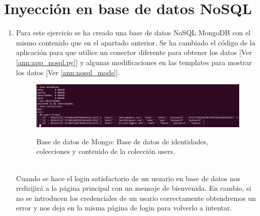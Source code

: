 \documentclass[a4paper,oneside]{article}
\begin{document}
\section{Inyección en base de datos NoSQL}
\begin{enumerate}[label=\textbf{\alph*)}]
\item Para este ejercicio se ha creado una base de datos NoSQL MongoDB \cite{mongo} con el mismo contenido que en el apartado anterior. Se ha cambiado el código de la aplicación para que utilice un conector diferente para obtener los datos [Ver \ref{ann:app_nosql.py}] y algunas modificaciones en las templates para mostrar los datos [Ver \ref{ann:nosql_mods}].
\begin{figure}[h!]
  \centering
  \includegraphics[scale=0.34]{images/mongo.png}\\
  \caption{Base de datos de Mongo: Base de datos de identidades, colecciones y contenido de la colección users.}
  \label{fig:mongo}
\end{figure}\\

Cuando se hace el login satisfactorio de un usuario en base de datos nos redirijirá a la página principal con un mensaje de bienvenida. En cambio, si no se introducen los credenciales de un usario correctamente obtendremos un error y nos deja en la misma página de login para volverlo a intentar.




\end{enumerate}
\end{document}
